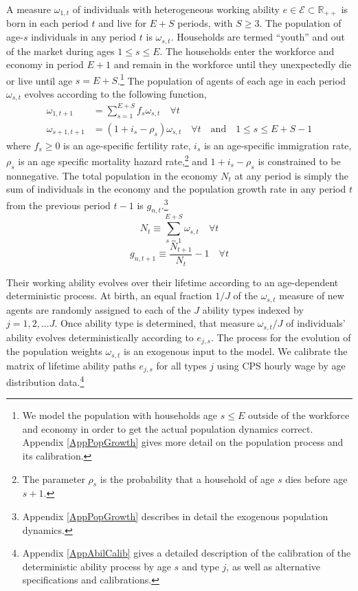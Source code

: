 \documentclass[letterpaper,12pt]{article}
\theoremstyle{definition}
\begin{document}
\begin{spacing}{1.5}
    A measure $\omega_{1,t}$ of individuals with heterogeneous working ability $e \in\mathcal{E}\subset\mathbb{R}_{++}$ is born in each period $t$ and live for $E+S$ periods, with $S\geq 3$. The population of age-$s$ individuals in any period $t$ is $\omega_{s,t}$. Households are termed ``youth'' and out of the market during ages $1\leq s\leq E$. The households enter the workforce and economy in period $E+1$ and remain in the workforce until they unexpectedly die or live until age $s=E+S$.\footnote{We model the population with households age $s\leq E$ outside of the workforce and economy in order to get the actual population dynamics correct. Appendix \ref{AppPopGrowth} gives more detail on the population process and its calibration.} The population of agents of each age in each period $\omega_{s,t}$ evolves according to the following function,
    \begin{equation}\label{EqPopLawofmotion}
      \begin{split}
        \omega_{1,t+1} &= \sum_{s=1}^{E+S} f_s\omega_{s,t}\quad\forall t \\
        \omega_{s+1,t+1} &= (1 + i_s - \rho_s)\omega_{s,t}\quad\forall t\quad\text{and}\quad 1\leq s \leq E+S-1
      \end{split}
    \end{equation}
    where $f_s\geq 0$ is an age-specific fertility rate, $i_s$ is an age-specific immigration rate, $\rho_s$ is an age specific mortality hazard rate,\footnote{The parameter $\rho_s$ is the probability that a household of age $s$ dies before age $s+1$.} and $1+i_s-\rho_s$ is constrained to be nonnegative. The total population in the economy $N_t$ at any period is simply the sum of individuals in the economy and the population growth rate in any period $t$ from the previous period $t-1$ is $g_{n,t}$.\footnote{Appendix \ref{AppPopGrowth} describes in detail the exogenous population dynamics.}
    \begin{equation}\label{EqPopDef}
      N_t\equiv\sum_{s=1}^{E+S} \omega_{s,t} \quad\forall t
    \end{equation}
    \begin{equation}\label{EqPopGrowth}
      g_{n,t+1} \equiv \frac{N_{t+1}}{N_t} - 1 \quad\forall t
    \end{equation}

    Their working ability evolves over their lifetime according to an age-dependent deterministic process. At birth, an equal fraction $1/J$ of the $\omega_{s,t}$ measure of new agents are randomly assigned to each of the $J$ ability types indexed by $j=1,2,...J$. Once ability type is determined, that measure $\omega_{s,t}/J$ of individuals' ability evolves deterministically according to $e_{j,s}$. The process for the evolution of the population weights $\omega_{s,t}$ is an exogenous input to the model. We calibrate the matrix of lifetime ability paths $e_{j,s}$ for all types $j$ using CPS hourly wage by age distribution data.\footnote{Appendix \ref{AppAbilCalib} gives a detailed description of the calibration of the deterministic ability process by age $s$ and type $j$, as well as alternative specifications and calibrations.}


\end{spacing}
\end{document}
